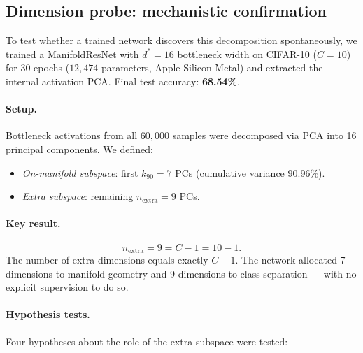 \documentclass[11pt,letterpaper]{article}
\begin{document}
\subsection{Dimension probe: mechanistic confirmation}
\label{sec:dimprobe}

To test whether a trained network discovers this decomposition
spontaneously, we trained a ManifoldResNet with $d^* = 16$ bottleneck
width on CIFAR-10 ($C = 10$) for 30 epochs ($12{,}474$ parameters,
Apple Silicon Metal) and extracted the internal activation PCA.
Final test accuracy: \textbf{68.54\%}.

\paragraph{Setup.}
Bottleneck activations from all $60{,}000$ samples were decomposed via
PCA into 16 principal components.  We defined:
\begin{itemize}[nosep]
  \item \emph{On-manifold subspace}: first $k_{90} = 7$ PCs
    (cumulative variance 90.96\%).
  \item \emph{Extra subspace}: remaining $n_{\mathrm{extra}} = 9$ PCs.
\end{itemize}

\paragraph{Key result.}
\begin{equation}
  \boxed{n_{\mathrm{extra}} = 9 = C - 1 = 10 - 1.}
\end{equation}
The number of extra dimensions equals exactly $C - 1$.  The network
allocated 7 dimensions to manifold geometry and 9 dimensions to class
separation — with no explicit supervision to do so.

\paragraph{Hypothesis tests.}
Four hypotheses about the role of the extra subspace were tested:
\end{document}

